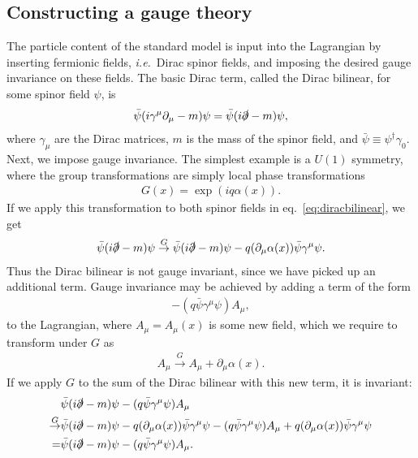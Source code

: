 \documentclass[twoside,english]{uiofysmaster}
\begin{document}
\subsection{Constructing a gauge theory}
The particle content of the standard model is input into the Lagrangian by inserting fermionic fields, {\it i.e.}\ Dirac spinor fields, and imposing the desired gauge invariance on these fields. The basic Dirac term, called the Dirac bilinear, for some spinor field $\psi$, is 
\begin{align}
	\bar \psi (i\gamma^\mu \partial_\mu - m) \psi = \bar \psi (i\slashed\partial - m)\psi, \label{eq:diracbilinear}
\end{align}
where $\gamma_\mu$ are the Dirac matrices, $m$ is the mass of the spinor field, and $\bar\psi \equiv \psi^\dag \gamma_0$. Next, we impose gauge invariance. The simplest example is a $U(1)$ symmetry, where the group transformations are simply local phase transformations 
\begin{align}
	G(x) = \exp(iq\alpha(x)).
\end{align}
If we apply this transformation to both spinor fields in eq.\ \eqref{eq:diracbilinear}, we get
\begin{align}
	\bar \psi (i\slashed\partial - m)\psi \overset{G}{\to} \bar \psi (i\slashed\partial - m)\psi - q(\partial_\mu \alpha(x))\bar\psi \gamma^\mu \psi.
\end{align}
Thus the Dirac bilinear is not gauge invariant, since we have picked up an additional term. Gauge invariance may be achieved by adding a term of the form
\begin{align}
	-(q\bar\psi \gamma^\mu \psi)A_\mu,\label{eq:covariantderivativeterm}
\end{align}
to the Lagrangian, where $A_\mu = A_\mu(x)$ is some new field, which we require to transform under $G$ as
\begin{align}
	A_\mu \overset{G}{\to} A_\mu + \partial_\mu \alpha(x).
\end{align}
If we apply $G$ to the sum of the Dirac bilinear with this new term, it is invariant:
\begin{align}
	&\bar \psi (i\slashed\partial - m)\psi -(q\bar\psi \gamma^\mu \psi)A_\mu\\
	\overset{G}{\to}&  \bar \psi (i\slashed\partial - m)\psi  - q(\partial_\mu \alpha(x))\bar\psi \gamma^\mu \psi - (q\bar\psi \gamma^\mu \psi)A_\mu + q(\partial_\mu \alpha(x))\bar\psi \gamma^\mu \psi\\
	=& \bar \psi (i\slashed\partial - m)\psi -(q\bar\psi \gamma^\mu \psi)A_\mu.
\end{align}
\end{document}

